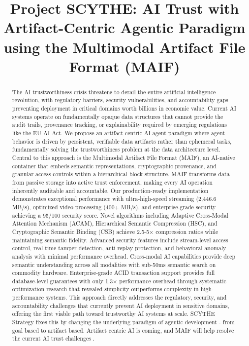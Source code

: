 \documentclass[conference]{IEEEtran}
\title{Project SCYTHE: AI Trust with Artifact-Centric Agentic Paradigm using the Multimodal Artifact File Format (MAIF)}
\author{
\IEEEauthorblockN{Cool Peeps Gang}
\IEEEauthorblockA{
Affiliation\\
Email: coolpeeps@owasp.org \& coolpeeps@industry.org}
}
\begin{document}
\maketitle

\begin{abstract}
The AI trustworthiness crisis threatens to derail the entire artificial intelligence revolution, with regulatory barriers, security vulnerabilities, and accountability gaps preventing deployment in critical domains worth billions in economic value. Current AI systems operate on fundamentally opaque data structures that cannot provide the audit trails, provenance tracking, or explainability required by emerging regulations like the EU AI Act. We propose an artifact-centric AI agent paradigm where agent behavior is driven by persistent, verifiable data artifacts rather than ephemeral tasks, fundamentally solving the trustworthiness problem at the data architecture level. Central to this approach is the Multimodal Artifact File Format (MAIF), an AI-native container that embeds semantic representations, cryptographic provenance, and granular access controls within a hierarchical block structure. MAIF transforms data from passive storage into active trust enforcement, making every AI operation inherently auditable and accountable. Our production-ready implementation demonstrates exceptional performance with ultra-high-speed streaming (2,446.6 MB/s), optimized video processing (400+ MB/s), and enterprise-grade security achieving a 95/100 security score. Novel algorithms including Adaptive Cross-Modal Attention Mechanism (ACAM), Hierarchical Semantic Compression (HSC), and Cryptographic Semantic Binding (CSB) achieve 2.5-5× compression ratios while maintaining semantic fidelity. Advanced security features include stream-level access control, real-time tamper detection, anti-replay protection, and behavioral anomaly analysis with minimal performance overhead. Cross-modal AI capabilities provide deep semantic understanding across all modalities with sub-50ms semantic search on commodity hardware. Enterprise-grade ACID transaction support provides full database-level guarantees with only 1.3× performance overhead through systematic optimization research that revealed simplicity outperforms complexity in high-performance systems. This approach directly addresses the regulatory, security, and accountability challenges that currently prevent AI deployment in sensitive domains, offering the first viable path toward trustworthy AI systems at scale. SCYTHE Strategy fixes this by changing the underlying paradigm of agentic development - from goal based to artifact based.
Artifact centric AI is coming, and MAIF will help resolve the current AI trust challenges \cite{googlemaspaper}.
\end{abstract}
\end{document}
